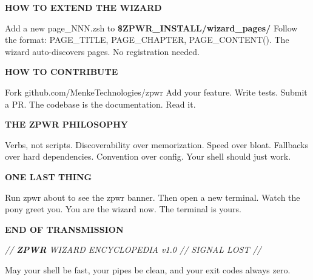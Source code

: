 \documentclass[11pt,a4paper,twoside]{book}
\begin{document}
\vspace{12pt}
{\bfseries\color{neonyellow} HOW TO EXTEND THE WIZARD}\vspace{4pt}

Add a new page\_NNN.zsh to \textbf{\$ZPWR\_INSTALL/wizard\_pages/} Follow the format: PAGE\_TITLE, PAGE\_CHAPTER, PAGE\_CONTENT(). The wizard auto-discovers pages. No registration needed.


\vspace{12pt}
{\bfseries\color{neonyellow} HOW TO CONTRIBUTE}\vspace{4pt}

Fork github.com/MenkeTechnologies/zpwr Add your feature. Write tests. Submit a PR. The codebase is the documentation. Read it.


\vspace{12pt}
{\bfseries\color{neonyellow} THE \textbf{ZPWR} PHILOSOPHY}\vspace{4pt}

Verbs, not scripts.  Discoverability over memorization. Speed over bloat.    Fallbacks over hard dependencies. Convention over config.  Your shell should just work.


\vspace{12pt}
{\bfseries\color{neonyellow} ONE LAST THING}\vspace{4pt}

Run zpwr about to see the zpwr banner. Then open a new terminal. Watch the pony greet you. You are the wizard now. The terminal is yours.


\vspace{10pt}
{\large\bfseries\color{neoncyan} END OF TRANSMISSION}\vspace{6pt}

{\small\itshape\color{dimtext} // \textbf{ZPWR} WIZARD ENCYCLOPEDIA v1.0 // SIGNAL LOST //}

May your shell be fast, your pipes be clean, and your exit codes always zero.


\vspace{16pt}
\end{document}

